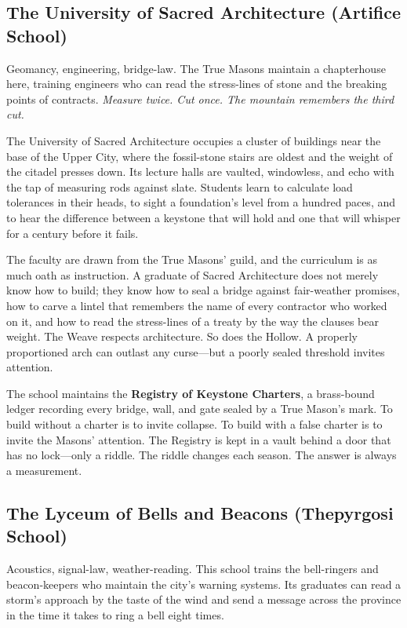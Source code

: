 \documentclass[10pt,twocolumn]{book}
\begin{document}
\subsection{The University of Sacred Architecture (Artifice School)}

Geomancy, engineering, bridge-law. The True Masons maintain a chapterhouse here, training engineers who can read the stress-lines of stone and the breaking points of contracts. \textit{Measure twice. Cut once. The mountain remembers the third cut.}

The University of Sacred Architecture occupies a cluster of buildings near the base of the Upper City, where the fossil-stone stairs are oldest and the weight of the citadel presses down. Its lecture halls are vaulted, windowless, and echo with the tap of measuring rods against slate. Students learn to calculate load tolerances in their heads, to sight a foundation's level from a hundred paces, and to hear the difference between a keystone that will hold and one that will whisper for a century before it fails.

The faculty are drawn from the True Masons' guild, and the curriculum is as much oath as instruction. A graduate of Sacred Architecture does not merely know how to build; they know how to seal a bridge against fair-weather promises, how to carve a lintel that remembers the name of every contractor who worked on it, and how to read the stress-lines of a treaty by the way the clauses bear weight. The Weave respects architecture. So does the Hollow. A properly proportioned arch can outlast any curse---but a poorly sealed threshold invites attention.

The school maintains the \textbf{Registry of Keystone Charters}, a brass-bound ledger recording every bridge, wall, and gate sealed by a True Mason's mark. To build without a charter is to invite collapse. To build with a false charter is to invite the Masons' attention. The Registry is kept in a vault behind a door that has no lock---only a riddle. The riddle changes each season. The answer is always a measurement.

\subsection{The Lyceum of Bells and Beacons (Thepyrgosi School)}

Acoustics, signal-law, weather-reading. This school trains the bell-ringers and beacon-keepers who maintain the city's warning systems. Its graduates can read a storm's approach by the taste of the wind and send a message across the province in the time it takes to ring a bell eight times.
\end{document}
